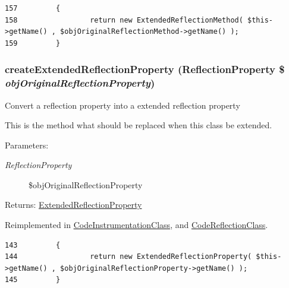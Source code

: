 \begin{Code}\begin{verbatim}157         {
158                 return new ExtendedReflectionMethod( $this->getName() , $objOriginalReflectionMethod->getName() );
159         }
\end{verbatim}
\end{Code}


\hypertarget{class_extended_reflection_class_bce271bf4f7b77b8b11986404241ab5c}{
\subsubsection[{createExtendedReflectionProperty}]{\setlength{\rightskip}{0pt plus 5cm}createExtendedReflectionProperty (ReflectionProperty \$ {\em objOriginalReflectionProperty})}}
\label{class_extended_reflection_class_bce271bf4f7b77b8b11986404241ab5c}


Convert a reflection property into a extended reflection property

This is the method what should be replaced when this class be extended.

\begin{Desc}
\item[Parameters:]
\begin{description}
\item[{\em ReflectionProperty}]\$objOriginalReflectionProperty \end{description}
\end{Desc}
\begin{Desc}
\item[Returns:]\hyperlink{class_extended_reflection_property}{ExtendedReflectionProperty} \end{Desc}


Reimplemented in \hyperlink{class_code_instrumentation_class_bce271bf4f7b77b8b11986404241ab5c}{CodeInstrumentationClass}, and \hyperlink{class_code_reflection_class_bce271bf4f7b77b8b11986404241ab5c}{CodeReflectionClass}.

\begin{Code}\begin{verbatim}143         {
144                 return new ExtendedReflectionProperty( $this->getName() , $objOriginalReflectionProperty->getName() );
145         }
\end{verbatim}
\end{Code}



